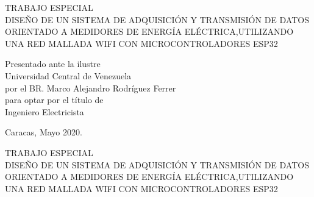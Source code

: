 \documentclass[12pt,letterpaper]{article}
\author{} %
\date{31 de julio de 2019} %
\begin{document}
	
	\renewcommand{\listfigurename}{Lista de Figuras}
	\renewcommand{\listtablename}{Lista de Tablas}
	\renewcommand{\contentsname}{Lista de Contenidos}
	\renewcommand{\figurename}{Figura}
	\renewcommand{\tablename}{Tabla}

	
\begin{center}

\vspace{3cm} TRABAJO ESPECIAL  \\

\vspace{8cm} DISEÑO DE UN SISTEMA DE ADQUISICIÓN Y TRANSMISIÓN DE DATOS ORIENTADO A MEDIDORES DE ENERGÍA ELÉCTRICA,UTILIZANDO UNA RED MALLADA WIFI CON MICROCONTROLADORES ESP32
\end{center}


\vspace{6cm}


	
\begin{flushright}
	
	
		Presentado ante la ilustre\\
		Universidad Central de Venezuela\\
		por el BR. Marco Alejandro Rodríguez Ferrer \\
		para optar por el título de \\
		Ingeniero Electricista   \\
	


\end{flushright}


\vspace{2cm}

\begin{center}
	Caracas, Mayo 2020.
\end{center}
\thispagestyle{empty}
\newpage

\begin{center}
	
	\vspace{3cm} TRABAJO ESPECIAL  \\
	
	\vspace{8cm} DISEÑO DE UN SISTEMA DE ADQUISICIÓN Y TRANSMISIÓN DE DATOS ORIENTADO A MEDIDORES DE ENERGÍA ELÉCTRICA,UTILIZANDO UNA RED MALLADA WIFI CON MICROCONTROLADORES ESP32
\end{center}


\vspace{6cm}
\end{document}
